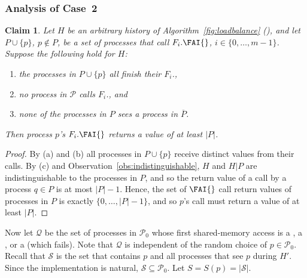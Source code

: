 \documentclass[11pt,letterpaper]{article}
\def\read{\text{\tt read}\xspace}
\newcommand{\SC}{\text{\tt SC}\xspace}
\newcommand{\LL}{\text{\tt LL}\xspace}
\newtheorem{claim}[theorem]{Claim}
\newcommand{\PP}{\mathcal{P}}
\newcommand{\QQ}{\mathcal{Q}}
\renewcommand{\SS}{\mathcal{S}}
\begin{document}
\subsubsection{Analysis of Case~2}
\begin{claim}\label{clm:lb_helper}\samepage
  Let $H$ be an arbitrary history of Algorithm~\ref{fig:loadbalance} (\LoadBalance),
  and let $P\cup\{p\}$, $p\not\in P$, be a set of processes that call $F_i.\FAI{}$, $i\in\{0,\dots,m-1\}$.
  Suppose the following hold for $H$:
  \begin{enumerate}
    \item[(a)] the processes in $P\cup\{p\}$ all finish their $F_i$.\FAI{},
    \item[(b)] no process in $\PP$ calls $F_i$.\FAD{}, and
    \item[(c)] none of the processes in $P$ sees a process in $\overline{P}$.
  \end{enumerate}
  Then process $p$'s $F_i.\FAI{}$ returns a value of at least $|P|$.
\end{claim}
\begin{proof}
  By (a) and (b) all processes in $P\cup\{p\}$ receive distinct values from their \FAI{} calls.
  By (c) and Observation~\ref{obs:indistinguishable}, $H$ and $H|P$ are indistinguishable to the processes in $P$, and so the return value of a \FAI{} call by a process $q\in P$ is at most $|P|-1$.
  Hence, the set of $\FAI{}$ call return values of processes in $P$ is exactly $\{0,\dots,|P|-1\}$, and so $p$'s \FAI{} call must return a value of at least $|P|$.
\end{proof}


Now let $\QQ$ be the set of processes in $\PP_0$ whose first shared-memory access is a \read, a \LL, or a \SC (which fails).
Note that $\QQ$ is independent of the random choice of $p\in\PP_0$.
Recall that $\SS$ is the set that contains $p$ and all processes that see $p$ during $H'$.
Since the \FAI{} implementation is natural, $\SS\subseteq\PP_0$.
Let $S=S(p)=|\SS|$.
\end{document}
